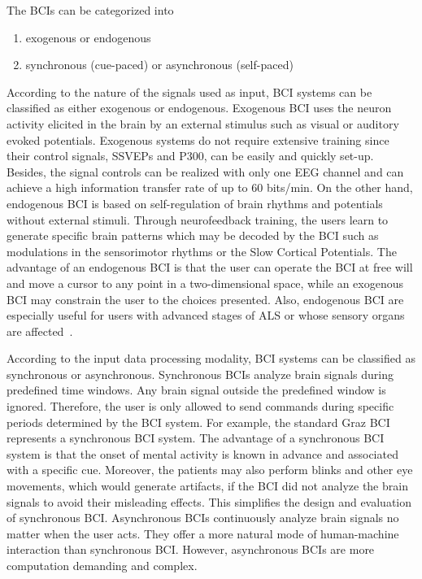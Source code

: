 The BCIs can be categorized into 
\begin{enumerate}
\item exogenous or endogenous
\item synchronous (cue-paced) or asynchronous (self-paced)
\end{enumerate}
According to the nature of the signals used as input, BCI systems can be classified as either exogenous or endogenous. Exogenous BCI uses the neuron activity elicited in the brain by an external stimulus such as visual or auditory evoked potentials. Exogenous systems do not require extensive training since their control signals, SSVEPs and P300, can be easily and quickly set-up. Besides, the signal controls can be realized with only one EEG channel and can achieve a high information transfer rate of up to 60 bits/min. On the other hand, endogenous BCI is based on self-regulation of brain rhythms and potentials without external stimuli. Through neurofeedback training, the users learn to generate specific brain patterns which may be decoded by the BCI such as modulations in the sensorimotor rhythms or the Slow Cortical Potentials. The advantage of an endogenous BCI is that the user can operate the BCI at free will and move a cursor to any point in a two-dimensional space, while an exogenous BCI may constrain the user to the choices presented. Also, endogenous BCI are especially useful for users with advanced stages of ALS or whose sensory organs are affected~\cite{4}.

According to the input data processing modality, BCI systems can be classified as synchronous or asynchronous. Synchronous BCIs analyze brain signals during predefined time windows. Any brain signal outside the predefined window is ignored. Therefore, the user is only allowed to send commands during specific periods determined by the BCI system. For example, the standard Graz BCI represents a synchronous BCI system. The advantage of a synchronous BCI system is that the onset of mental activity is known in advance and associated with a specific cue. Moreover, the patients may also perform blinks and other eye movements, which would generate artifacts, if the BCI did not analyze the brain signals to avoid their misleading effects. This simplifies the design and evaluation of synchronous BCI. Asynchronous BCIs continuously analyze brain signals no matter when the user acts. They offer a more natural mode of human-machine interaction than synchronous BCI. However, asynchronous BCIs are more computation demanding and complex. 

